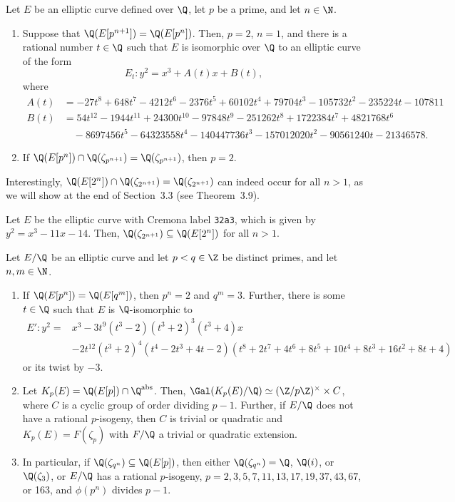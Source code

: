 \begin{thm} %
Let $E$ be an elliptic curve defined over $\Q$, let $p$ be a prime, and let $n \in \N$.
	\begin{enumerate}[(1)]
	\item Suppose that $\Q(E[p^{n+1}])= \Q(E[p^n])$. Then, $p= 2$, $n= 1$, and there is a rational number $t \in \Q$ such that $E$ is isomorphic over $\Q$ to an elliptic curve of the form
		\[
		E_t \colon y^2= x^3 + A(t)x + B(t),
		\]
	where
		\[
		\begin{aligned}
		A(t)&= -27 t^8 + 648 t^7 - 4212 t^6 - 2376 t^5 + 60102 t^4 + 79704 t^3 - 105732 t^2 - 235224 t - 107811 \\
		B(t)&= 54 t^{12} - 1944 t^{11} + 24300 t^{10} - 97848 t^9 - 251262 t^8 + 1722384 t^7 + 4821768 t^6 \\
		&\quad - 8697456 t^5 - 64323558 t^4 - 140447736 t^3 - 157012020 t^2 - 90561240 t - 21346578.
		\end{aligned}
		\]
	\item If $\Q(E[p^n]) \cap \Q(\zeta_{p^{n+1}})= \Q(\zeta_{p^{n+1}})$, then $p= 2$.
	\end{enumerate}
\end{thm}


Interestingly, $\Q(E[2^n]) \cap \Q(\zeta_{2^{n+1}})= \Q(\zeta_{2^{n+1}})$ can indeed
occur for all $n > 1$, as we will show at the end of Section~3.3 (see Theorem~3.9).


\begin{thm} %
Let $E$ be the elliptic curve with Cremona label \texttt{32a3}, which is given by $y^2= x^3 - 11x - 14$. Then, $\Q(\zeta_{2^{n+1}}) \subseteq \Q(E[2^n])$ for all $n > 1$. 
\end{thm}


\begin{thm} %
Let $E/\Q$ be an elliptic curve and let $p < q \in \Z$ be distinct primes, and let $n,m \in \N$.
	\begin{enumerate}[(1)]
	\item If $\Q(E[p^n])= \Q(E[q^m])$, then $p^n= 2$ and $q^m= 3$. Further, there is some $t \in \Q$ such that $E$ is $\Q$-isomorphic to
		\[
		\begin{aligned}
		E' \colon y^2= &x^3 - 3t^9 (t^3 - 2)(t^3+2)^3 (t^3+4) x \\
		&- 2t^{12} (t^3+2)^4(t^4 - 2t^3 + 4t - 2)(t^8 + 2t^7 + 4t^6 + 8t^5 + 10t^4 + 8t^3 + 16t^2 + 8t + 4)
		\end{aligned}
		\]
	or its twist by $-3$. 
	\item Let $K_p(E)= \Q(E[p]) \cap \Q^{\text{abs}}$. Then, $\Gal(K_p(E)/\Q) \simeq (\Z/p\Z)^\times \times C$, where $C$ is a cyclic group of order dividing $p - 1$. Further, if $E/\Q$ does not have a rational $p$-isogeny, then $C$ is trivial or quadratic and $K_p(E)= F(\zeta_p)$ with $F/\Q$ a trivial or quadratic extension.
	\item In particular, if $\Q(\zeta_{q^n}) \subseteq \Q(E[p])$, then either $\Q(\zeta_{q^n})= \Q$, $\Q(i)$, or $\Q(\zeta_3)$, or $E/\Q$ has a rational $p$-isogeny, $p= 2,3,5,7,11,13,17,19,37,43,67$, or 163, and $\phi(p^n)$ divides $p - 1$. 
	\end{enumerate}
\end{thm}



